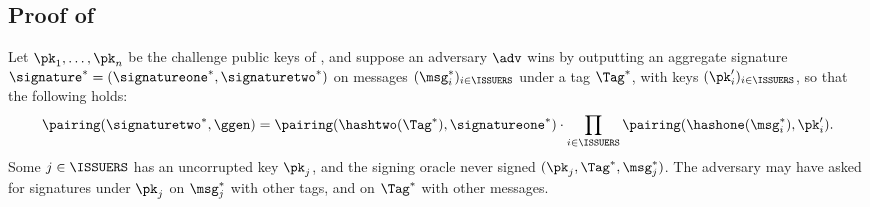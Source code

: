 
\subsection{Proof of }\label{sec:agg-creds-proof-2}

Let $\pk_1, \ldots, \pk_n$ be the challenge public keys of
, and suppose an adversary $\adv$ wins by outputting an
aggregate signature $\signature^* = (\signatureone^*, \signaturetwo^*)$ on
messages $(\msg_i^*)_{i \in \ISSUERS}$ under a tag $\Tag^*$, with keys
$(\pk'_i)_{i \in \ISSUERS}$, so that the following holds:
%
\begin{equation*}
  \pairing(\signaturetwo^*,\ggen) = \pairing(\hashtwo(\Tag^*), \signatureone^*)\cdot
\prod_{i \in \ISSUERS} \pairing(\hashone(\msg_i^*), \pk'_i).
\end{equation*}
%
Some $j \in \ISSUERS$ has an uncorrupted key $\pk_j$, and the signing oracle
never signed $(\pk_j, \Tag^*, \msg_j^*)$. The adversary may have asked for
signatures under $\pk_j$ on $\msg_j^*$ with other tags, and on $\Tag^*$ with
other messages.

